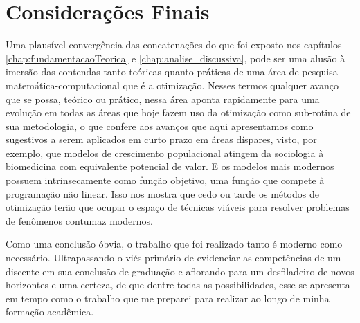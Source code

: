 \section{Considerações Finais}
\label{sec:consideracoesFinais}

\noindent
Uma plausível convergência das concatenações do que foi exposto nos capítulos
\ref{chap:fundamentacaoTeorica} e \ref{chap:analise_discussiva}, pode ser uma
alusão à imersão das contendas tanto teóricas quanto práticas de uma área de
pesquisa matemática-computacional que é a otimização. Nesses termos qualquer
avanço que se possa, teórico ou prático, nessa área aponta rapidamente para
uma evolução em todas as áreas que hoje fazem uso da otimização como
sub-rotina de sua metodologia, o que confere aos avanços que aqui apresentamos
como sugestivos a serem aplicados em curto prazo em áreas díspares, visto, por
exemplo, que modelos de crescimento populacional atingem da sociologia à
biomedicina com equivalente potencial de valor. E os modelos mais modernos
possuem intrinsecamente como função objetivo, uma função que compete à
programação não linear. Isso nos mostra que cedo ou tarde os métodos de
otimização terão que ocupar o espaço de técnicas viáveis para resolver
problemas de fenômenos contumaz modernos.

Como uma conclusão óbvia, o trabalho que foi realizado tanto é moderno como
necessário. Ultrapassando o viés primário de evidenciar as competências de um
discente em sua conclusão de graduação e aflorando para um desfiladeiro de
novos horizontes e uma certeza, de que dentre todas as possibilidades, esse se
apresenta em tempo como o trabalho que me preparei para realizar ao longo de
minha formação acadêmica.